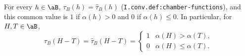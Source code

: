 For every $h\in\aB$, $\tau_B(h)=\hat\tau_B(h)$ (\texttt{I.conv.def:chamber-functions}), and this common value is $1$ if $\alpha(h)>0$ and
$0$ if $\alpha(h)\le0$. In particular, for $H,T\in\aB$,
\[
  \tau_B(H-T)=\hat\tau_B(H-T)=\begin{cases}1&\alpha(H)>\alpha(T),\\0&\alpha(H)\le\alpha(T).\end{cases}
\]
